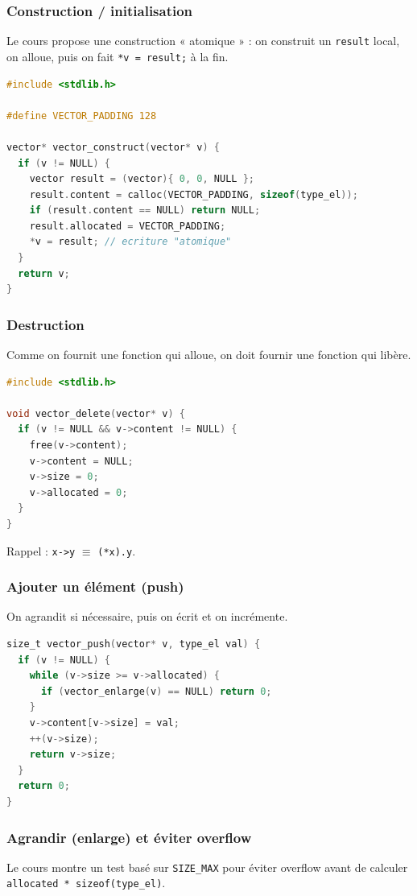\subsubsection{Construction / initialisation}
Le cours propose une construction « atomique » : on construit un \texttt{result} local, on alloue, puis on fait \texttt{*v = result;} à la fin.
\begin{lstlisting}[language=C]
#include <stdlib.h>

#define VECTOR_PADDING 128

vector* vector_construct(vector* v) {
  if (v != NULL) {
    vector result = (vector){ 0, 0, NULL };
    result.content = calloc(VECTOR_PADDING, sizeof(type_el));
    if (result.content == NULL) return NULL;
    result.allocated = VECTOR_PADDING;
    *v = result; // ecriture "atomique"
  }
  return v;
}
\end{lstlisting}

\subsubsection{Destruction}
Comme on fournit une fonction qui alloue, on doit fournir une fonction qui libère. 

\begin{lstlisting}[language=C]
#include <stdlib.h>

void vector_delete(vector* v) {
  if (v != NULL && v->content != NULL) {
    free(v->content);
    v->content = NULL;
    v->size = 0;
    v->allocated = 0;
  }
}
\end{lstlisting}

Rappel : \texttt{x->y} $\equiv$ \texttt{(*x).y}. 

\subsubsection{Ajouter un élément (push)}
On agrandit si nécessaire, puis on écrit et on incrémente. 

\begin{lstlisting}[language=C]
size_t vector_push(vector* v, type_el val) {
  if (v != NULL) {
    while (v->size >= v->allocated) {
      if (vector_enlarge(v) == NULL) return 0;
    }
    v->content[v->size] = val;
    ++(v->size);
    return v->size;
  }
  return 0;
}
\end{lstlisting}

\subsubsection{Agrandir (enlarge) et éviter overflow}
Le cours montre un test basé sur \texttt{SIZE\_MAX} pour éviter overflow avant de calculer \texttt{allocated * sizeof(type\_el)}.

